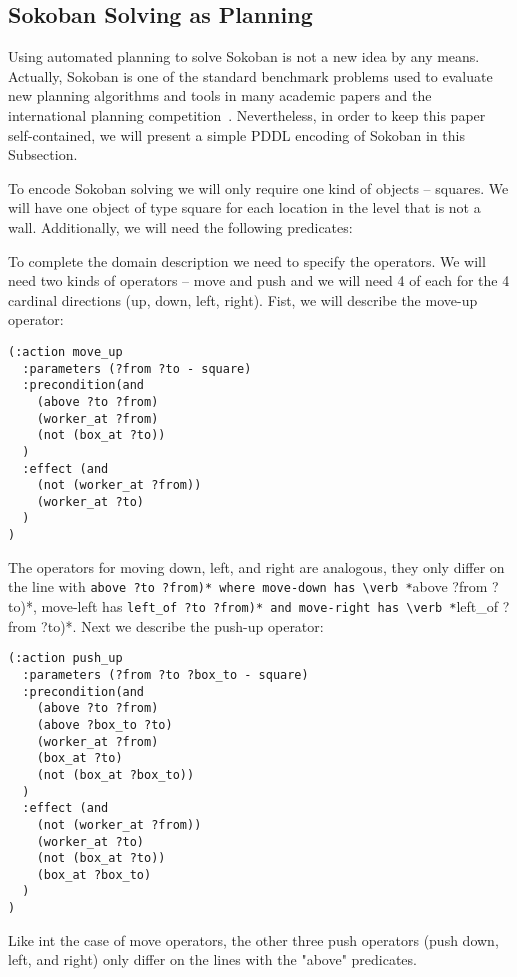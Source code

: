 \documentclass[runningheads]{llncs}
\begin{document}
\subsection{Sokoban Solving as Planning}
Using automated planning to solve Sokoban is not a new idea by any means. Actually, Sokoban is one of the
standard benchmark problems used to evaluate new planning algorithms and tools in many academic papers
and the international planning competition~\cite{TODO}. Nevertheless, in order to keep this paper self-contained,
we will present a simple PDDL encoding of Sokoban in this Subsection.

To encode Sokoban solving we will only require one kind of objects -- squares. We will have one
object of type square for each location in the level that is not a wall. Additionally, we will
need the following predicates:
To complete the domain description we need to specify the operators. We will need two kinds
of operators -- move and push and we will need 4 of each for the 4 cardinal directions (up, down, left, right).
Fist, we will describe the move-up operator:
\begin{verbatim}
(:action move_up
  :parameters (?from ?to - square)
  :precondition(and
    (above ?to ?from)
    (worker_at ?from)
    (not (box_at ?to))
  )
  :effect (and
    (not (worker_at ?from))
    (worker_at ?to)    
  )
)
\end{verbatim}
The operators for moving down, left, and right are analogous, they only differ on the line with
\verb *(above ?to ?from)* where move-down has \verb *(above ?from ?to)*, move-left has
\verb *(left_of ?to ?from)* and move-right has \verb *(left_of ?from ?to)*.
Next we describe the push-up operator:
\begin{verbatim}
(:action push_up
  :parameters (?from ?to ?box_to - square)
  :precondition(and
    (above ?to ?from)
    (above ?box_to ?to)
    (worker_at ?from)
    (box_at ?to)
    (not (box_at ?box_to))
  )
  :effect (and
    (not (worker_at ?from))
    (worker_at ?to)    
    (not (box_at ?to))
    (box_at ?box_to)
  )
)
\end{verbatim}
Like int the case of move operators, the other three push operators (push down, left, and right) only differ
on the lines with the "above" predicates.
\end{document}
